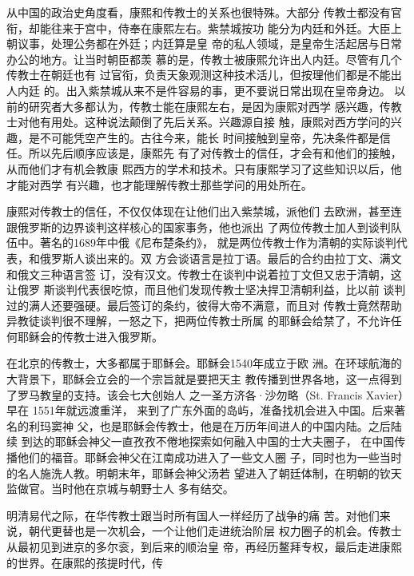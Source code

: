 \par
从中国的政治史角度看，康熙和传教士的关系也很特殊。大部分%
传教士都没有官衔，却能往来于宫中，侍奉在康熙左右。紫禁城按功%
能分为内廷和外廷。大臣上朝议事，处理公务都在外廷；内廷算是皇%
帝的私人领域，是皇帝生活起居与日常办公的地方。让当时朝臣都羡%
慕的是，传教士被康熙允许出人内廷。尽管有几个传教士在朝廷也有%
过官衔，负责天象观测这种技术活儿，但按理他们都是不能出人内廷%
的。出入紫禁城从来不是件容易的事，更不要说日常出现在皇帝身边。%
以前的研究者大多都认为，传教士能在康熙左右，是因为康熙对西学%
感兴趣，传教士对他有用处。这种说法颠倒了先后关系。兴趣源自接%
触，康熙对西方学问的兴趣，是不可能凭空产生的。古往今来，能长%
时间接触到皇帝，先决条件都是信任。所以先后顺序应该是，康熙先%
有了对传教士的信任，才会有和他们的接触，从而他们才有机会教康%
熙西方的学术和技术。只有康熙学习了这些知识以后，他才能对西学%
有兴趣，也才能理解传教士那些学问的用处所在。%
\par
康熙对传教士的信任，不仅仅体现在让他们出入紫禁城，派他们%
去欧洲，甚至连跟俄罗斯的边界谈判这样核心的国家事务，他也派出%
了两位传教士加人到谈判队伍中。著名的1689年中俄《尼布楚条约》，%
就是两位传教士作为清朝的实际谈判代表，和俄罗斯人谈出来的。双%
方会谈语言是拉丁语。最后的合约由拉丁文、满文和俄文三种语言签%
订，没有汉文。传教士在谈判中说着拉丁文但又忠于清朝，这让俄罗%
斯谈判代表很吃惊，而且他们发现传教士坚决捍卫清朝利益，比以前%
谈判过的满人还要强硬。最后签订的条约，彼得大帝不满意，而且对%
传教士竟然帮助异教徒谈判很不理解，一怒之下，把两位传教士所属%
的耶稣会给禁了，不允许任何耶稣会的传教士进入俄罗斯。%
\par
在北京的传教士，大多都属于耶稣会。耶稣会1540年成立于欧%
洲。在环球航海的大背景下，耶稣会立会的一个宗旨就是要把天主%
教传播到世界各地，这一点得到了罗马教皇的支持。该会七大创始人%
之一圣方济各·沙勿略（St. Francis Xavier）早在 1551年就远渡重洋，%
来到了广东外面的岛屿，准备找机会进入中国。后来著名的利玛窦神%
父，也是耶稣会传教士，他是在万历年间进人的中国内陆。之后陆续%
到达的耶稣会神父一直孜孜不倦地探索如何融入中国的士大夫圈子，%
在中国传播他们的福音。耶稣会神父在江南成功进入了一些文人圈%
子，同时也为一些当时的名人施洗人教。明朝末年，耶稣会神父汤若%
望进入了朝廷体制，在明朝的钦天监做官。当时他在京城与朝野士人%
多有结交。%
\par
明清易代之际，在华传教士跟当时所有国人一样经历了战争的痛%
苦。对他们来说，朝代更替也是一次机会，一个让他们走进统治阶层%
权力圈子的机会。传教士从最初见到进京的多尔衮，到后来的顺治皇%
帝，再经历鳌拜专权，最后走进康熙的世界。在康熙的孩提时代，传%
